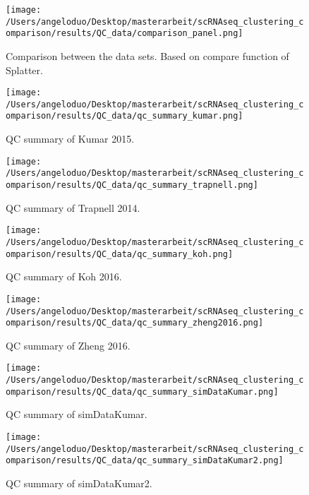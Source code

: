 \documentclass[11pt, a4paper]{article}\usepackage[]{graphicx}\usepackage[]{color}
\begin{document}
\begin{figure}[!h]
\texttt{[image: /Users/angeloduo/Desktop/masterarbeit/scRNAseq\_clustering\_comparison/results/QC\_data/comparison\_panel.png]}
\caption{Comparison between the data sets. Based on compare function of Splatter.}
\label{fig:compare}
\end{figure}

\begin{figure}[!h]
\texttt{[image: /Users/angeloduo/Desktop/masterarbeit/scRNAseq\_clustering\_comparison/results/QC\_data/qc\_summary\_kumar.png]}
\caption{QC summary of Kumar 2015. }
\label{fig:qckumar}
\end{figure}

\begin{figure}[!h]
\texttt{[image: /Users/angeloduo/Desktop/masterarbeit/scRNAseq\_clustering\_comparison/results/QC\_data/qc\_summary\_trapnell.png]}
\caption{QC summary of Trapnell 2014. }
\label{fig:qctrapnell}
\end{figure}

\begin{figure}[!h]
\texttt{[image: /Users/angeloduo/Desktop/masterarbeit/scRNAseq\_clustering\_comparison/results/QC\_data/qc\_summary\_koh.png]}
\caption{QC summary of Koh 2016. }
\label{fig:qckoh}
\end{figure}

\begin{figure}[!h]
\texttt{[image: /Users/angeloduo/Desktop/masterarbeit/scRNAseq\_clustering\_comparison/results/QC\_data/qc\_summary\_zheng2016.png]}
\caption{QC summary of Zheng 2016. }
\label{fig:qczheng}
\end{figure}

\begin{figure}[!h]
\texttt{[image: /Users/angeloduo/Desktop/masterarbeit/scRNAseq\_clustering\_comparison/results/QC\_data/qc\_summary\_simDataKumar.png]}
\caption{QC summary of simDataKumar. }
\label{fig:simDataKumar}
\end{figure}

\begin{figure}[!h]
\texttt{[image: /Users/angeloduo/Desktop/masterarbeit/scRNAseq\_clustering\_comparison/results/QC\_data/qc\_summary\_simDataKumar2.png]}
\caption{QC summary of simDataKumar2. }
\label{fig:simDataKumar}
\end{figure}
\end{document}
